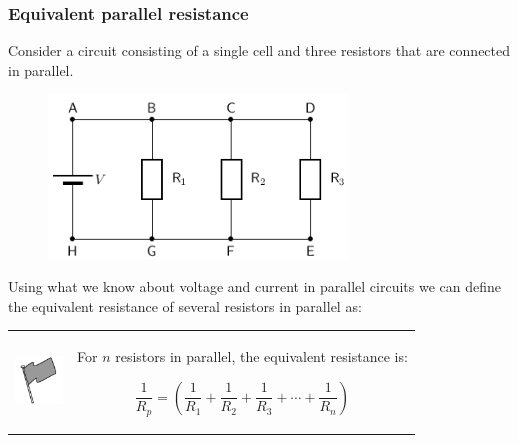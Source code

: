             \subsubsection{ Equivalent parallel resistance}
            \nopagebreak
            \label{m38776*id65406}Consider a circuit consisting of a single cell and three resistors that are connected in parallel.\par 
          \label{m38776*id65410}
    \setcounter{subfigure}{0}
	\begin{figure}[H] %
    \begin{center}
    \label{m38776*id65414!!!underscore!!!media}\label{m38776*id65414!!!underscore!!!printimage}\includegraphics[width=300px]{col11305.imgs/m38776_PG11C9_009.png} %
      \vspace{2pt}
    \vspace{.1in}
    \end{center}
 \end{figure}       
          \par 
\label{m38776*eip-754}Using what we know about voltage and current in parallel circuits we can define the equivalent resistance of several resistors in parallel as:\par \label{m38776*fhsst!!!underscore!!!id1576}\begin{definition}
	  \begin{tabular*}{15 cm}{m{15 mm}m{}}
	\hspace*{-50pt}  \includegraphics[width=0.5in]{col11305.imgs/psflag2.png}   & \Definition{   \label{id2487427}\textbf{ Equivalent resistance in a parallel circuit, ${R}_{p}$ }} { \label{m38776*meaningfhsst!!!underscore!!!id1576}
          \label{m38776*id6613206}For $n$ resistors in parallel, the equivalent resistance is:\par 
          \label{m38776*uid2944}\nopagebreak\noindent{}
            
    \begin{equation}
    \frac{1}{{R}_{p}}=\left(\frac{1}{{R}_{1}}+\frac{1}{{R}_{2}}+\frac{1}{{R}_{3}}+\cdots +\frac{1}{{R}_{n}}\right)\tag{16.38}
      \end{equation}
           } 
      \end{tabular*}
      \end{definition}
